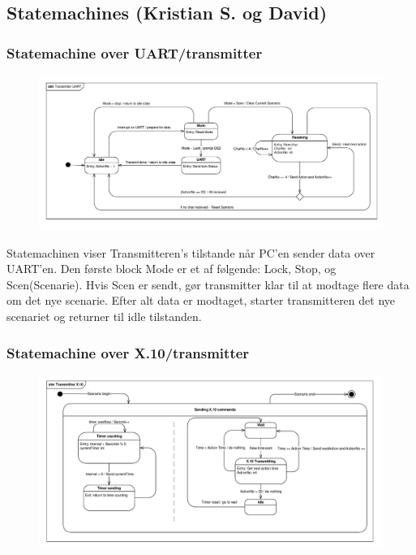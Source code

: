 \begin{landscape}
\section{Statemachines (Kristian S. og David)}

\subsubsection{Statemachine over UART/transmitter }

\begin{figure}[h]
\centering
\includegraphics[width=\textheight + 190pt,clip=true, trim=18 18 10 18]{Systemarkitektur/diagrammer/Stm_transmitter_UART} %
\end{figure}

Statemachinen viser Transmitteren's tilstande når PC'en sender data over UART'en. Den første block Mode er et af følgende: Lock, Stop, og Scen(Scenarie). Hvis Scen er sendt, gør transmitter klar til at modtage flere data om det nye scenarie. Efter alt data er modtaget, starter transmitteren det nye scenariet og returner til idle tilstanden.

\newpage

\subsubsection{Statemachine over X.10/transmitter }

\begin{figure}[h]
\centering
\includegraphics[width=\textheight + 190pt,clip=true, trim=18 15 18 12]{Systemarkitektur/diagrammer/Stm_transmitter_X10} %
\end{figure}


\end{landscape}
